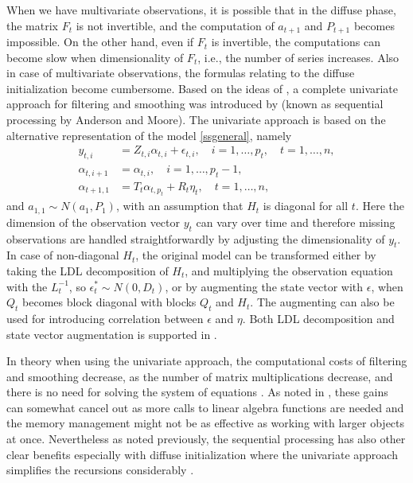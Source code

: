 \documentclass[nojss,article]{jss}\usepackage[]{graphicx}\usepackage[]{color}
\begin{document}
When we have multivariate observations, it is possible that in the diffuse phase, the matrix $F_t$ is not
invertible, and the computation of $a_{t+1}$ and $P_{t+1}$ becomes
impossible. On the other hand, even if $F_t$ is invertible, the computations can
become slow when dimensionality of $F_t$, i.e., the number of series increases. Also in case of multivariate observations, the formulas relating to the diffuse initialization become cumbersome. Based on the ideas of \citet{AM1979}, a complete univariate approach for filtering and smoothing was introduced by \citet{KD2000} (known as sequential processing by Anderson and Moore). The univariate approach is based on the alternative representation of the model \eqref{ssgeneral}, namely
\begin{equation*}
\begin{aligned}
y_{t,i} &= Z_{t,i}\alpha_{t,i} + \epsilon_{t,i},  \quad i=1,\ldots,p_t, \quad t=1,\ldots,n, \\
\alpha_{t,i+1} &= \alpha_{t,i},  \quad i=1,\ldots,p_t-1,\\
\alpha_{t+1,1} &= T_t\alpha_{t,p_t} + R_t\eta_{t},  \quad t=1,\ldots,n,
\end{aligned}
\end{equation*}
and $a_{1,1} \sim N(a_1,P_1)$, with an assumption that $H_t$ is diagonal for all $t$. Here the dimension of the observation vector $y_t$ can vary over time and therefore missing observations are handled
straightforwardly by adjusting the dimensionality of $y_t$. In case of
non-diagonal $H_t$, the original model can be transformed either by taking the
LDL decomposition of $H_t$, and multiplying the observation equation with the
$L_t^{-1}$, so $\epsilon_t^* \sim N(0,D_t)$, or by augmenting the state vector
with $\epsilon$, when $Q_t$ becomes block diagonal with blocks $Q_t$ and $H_t$. The augmenting can also be used for introducing correlation between $\epsilon$ and $\eta$. Both LDL decomposition and state vector augmentation is supported in .

In theory when using the univariate approach, the computational costs of filtering and smoothing
decrease, as the number of matrix multiplications decrease, and there is no need
for solving the system of equations \citep[p. 159]{DK2012}. As noted in \citep{Tusell2010}, these gains can somewhat cancel out as more calls to linear algebra functions are needed and the memory management might not be as effective as working with larger objects at once. Nevertheless as noted previously, the sequential processing has also other clear benefits especially with diffuse initialization where the univariate approach simplifies the recursions considerably \citep{DK2012}.
\end{document}
